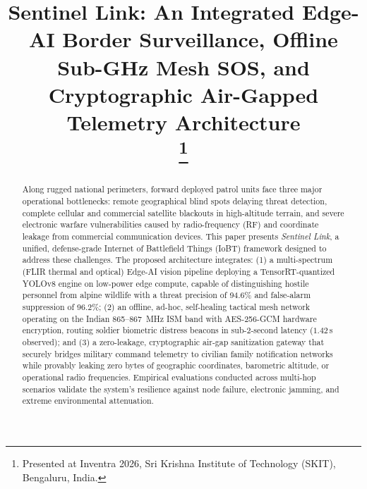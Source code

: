 \documentclass[conference]{IEEEtran}
\begin{document}
\title{Sentinel Link: An Integrated Edge-AI Border Surveillance, Offline Sub-GHz Mesh SOS, and Cryptographic Air-Gapped Telemetry Architecture\\
\thanks{Presented at Inventra 2026, Sri Krishna Institute of Technology (SKIT), Bengaluru, India.}
}

\author{
}

\maketitle

\begin{abstract}
Along rugged national perimeters, forward deployed patrol units face three major operational bottlenecks: remote geographical blind spots delaying threat detection, complete cellular and commercial satellite blackouts in high-altitude terrain, and severe electronic warfare vulnerabilities caused by radio-frequency (RF) and coordinate leakage from commercial communication devices. This paper presents \textit{Sentinel Link}, a unified, defense-grade Internet of Battlefield Things (IoBT) framework designed to address these challenges. The proposed architecture integrates: (1) a multi-spectrum (FLIR thermal and optical) Edge-AI vision pipeline deploying a TensorRT-quantized YOLOv8 engine on low-power edge compute, capable of distinguishing hostile personnel from alpine wildlife with a threat precision of 94.6\% and false-alarm suppression of 96.2\%; (2) an offline, ad-hoc, self-healing tactical mesh network operating on the Indian 865--867~MHz ISM band with AES-256-GCM hardware encryption, routing soldier biometric distress beacons in sub-2-second latency ($1.42$\,s observed); and (3) a zero-leakage, cryptographic air-gap sanitization gateway that securely bridges military command telemetry to civilian family notification networks while provably leaking zero bytes of geographic coordinates, barometric altitude, or operational radio frequencies. Empirical evaluations conducted across multi-hop scenarios validate the system's resilience against node failure, electronic jamming, and extreme environmental attenuation.
\end{abstract}
\end{document}
